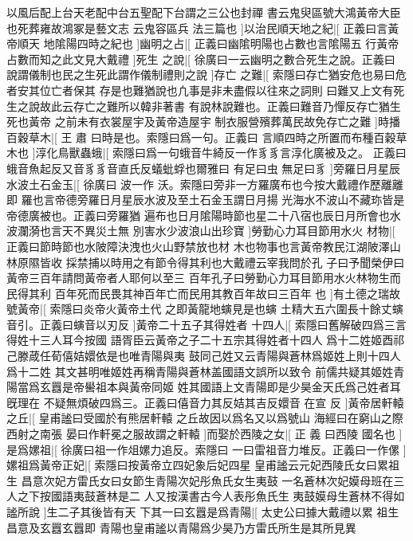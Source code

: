 %
以風后配上台天老配中台五聖配下台謂之三公也封禪%
書云鬼臾區號大鴻黃帝大臣也死葬雍故鴻冢是藝文志%
%
云鬼容區兵%
法三篇也%
]以治民順天地之紀|[%
正義曰言黃帝順天%
地隂陽四時之紀也%
%
]幽明之占|[%
正義曰幽隂明陽也占數也言隂陽五%
行黃帝占數而知之此文見大戴禮%
]死生%
%
之說|[%
徐廣曰一云幽明之數合死生之說。正義曰%
說謂儀制也民之生死此謂作儀制禮則之說%
]存亡%
%
之難|[%
索隱曰存亡猶安危也易曰危者安其位亡者保其%
存是也難猶說也凢事是非未盡假以往來之詞則%
%
曰難又上文有死生之說故此云存亡之難所以韓非著書%
有說林說難也。正義曰難音乃憚反存亡猶生死也黃帝%
%
之前未有衣裳屋宇及黃帝造屋宇%
制衣服營殯葬萬民故免存亡之難%
]時播百穀草木|[%
王%
肅%
%
曰時是也。索隱曰爲一句。正義曰%
言順四時之所置而布種百穀草木也%
]淳化鳥獸蟲蛾|[%
%
索隱曰爲一句蛾音牛綺反一作豸豸言淳化廣被及之。%
正義曰蛾音魚起反又音豸豸音直氏反蟻蚍蜉也爾雅曰%
%
有足曰虫%
無足曰豸%
]旁羅日月星辰水波土石金玉|[%
徐廣曰%
波一作%
%
沃。索隱曰旁非一方羅廣布也今按大戴禮作歷離離即%
羅也言帝德旁羅日月星辰水波及至土石金玉謂日月揚%
%
光海水不波山不藏珎皆是帝德廣被也。正義曰旁羅猶%
遍布也日月隂陽時節也星二十八宿也辰日月所會也水%
%
波瀾漪也言天不異災土無%
別害水少波浪山出珍寶%
]勞勤心力耳目節用水火%
%
材物|[%
正義曰節時節也水陂障決洩也火山野禁放也材%
木也物事也言黃帝教民江湖陂澤山林原隰皆收%
%
採禁捕以時用之有節令得其利也大戴禮云宰我問於孔%
子曰予聞榮伊曰黃帝三百年請問黃帝者人耶何以至三%
%
百年孔子曰勞勤心力耳目節用水火林物生而民得其利%
百年死而民畏其神百年亡而民用其教百年故曰三百年%
%
也%
]有土德之瑞故號黃帝|[%
索隱曰炎帝火黃帝土代%
之即黃龍地螾見是也螾%
%
土精大五六圍長十餘丈螾%
音引。正義曰螾音以刃反%
]黃帝二十五子其得姓者%
%
十四人|[%
索隱曰舊解破四爲三言得姓十三人耳今按國%
語胥臣云黃帝之子二十五宗其得姓者十四人%
%
爲十二姓姬酉祁己滕葴任荀僖姞嬛依是也唯青陽與夷%
鼓同己姓又云青陽與蒼林爲姬姓上則十四人爲十二姓%
%
其文甚明唯姬姓再稱青陽與蒼林盖國語文誤所以致令%
前儒共疑其姬姓青陽當爲玄囂是帝嚳祖本與黃帝同姬%
%
姓其國語上文青陽即是少昊金天氏爲己姓者耳旣理在%
不疑無煩破四爲三。正義曰僖音力其反姞其吉反嬛音%
%
在宣%
反%
]黃帝居軒轅之丘|[%
皇甫謐曰受國於有熊居軒轅%
之丘故因以爲名又以爲號山%
%
海經曰在窮山之際西射之南張%
晏曰作軒冕之服故謂之軒轅%
]而娶於西陵之女|[%
正%
義%
%
曰西陵%
國名也%
]是爲嫘祖|[%
徐廣曰祖一作俎嫘力追反。索隱曰%
一曰雷祖音力堆反。正義曰一作傫%
%
]嫘祖爲黃帝正妃|[%
索隱曰按黃帝立四妃象后妃四星%
皇甫謐云元妃西陵氏女曰累祖生%
%
昌意次妃方雷氏女曰女節生青陽次妃彤魚氏女生夷鼓%
一名蒼林次妃嫫母班在三人之下按國語夷鼓蒼林是二%
%
人又按漢書古今人表彤魚氏生%
夷鼓嫫母生蒼林不得如謐所說%
]生二子其後皆有天%
%
下其一曰玄囂是爲青陽|[%
太史公曰據大戴禮以累%
祖生昌意及玄囂玄囂即%
%
青陽也皇甫謐以青陽爲少昊乃方雷氏所生是其所見異%

